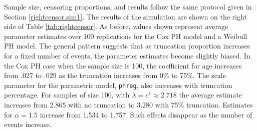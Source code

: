 Sample size, censoring proportions, and results follow the same protocol given in Section \ref{rightcensor.sim1}.  The results of the simulation are shown on the right side of Table \ref{tab:rightcensor}.  As before, values shown represent average parameter estimates over 100 replications for the Cox PH model and a Weibull PH model. The general pattern suggests that as truncation proportion increases for a fixed number of events, the parameter estimates become slightly biased.  In the Cox PH case when the sample size is 100, the coefficient for age increases from .027 to .029 as the truncation increases from 0\% to 75\%. The scale parameter for the parametric model, {\tt phreg}, also increases with truncation percentage.  For samples of size 100, with $\lambda = e^1 \approx 2.718$ the average estimate increases from $2.865$ with no truncation to $3.280$ with 75\% truncation.  Estimates for $\alpha = 1.5$ increase from 1.534 to 1.757. Such effects disappear as the number of events increase.
